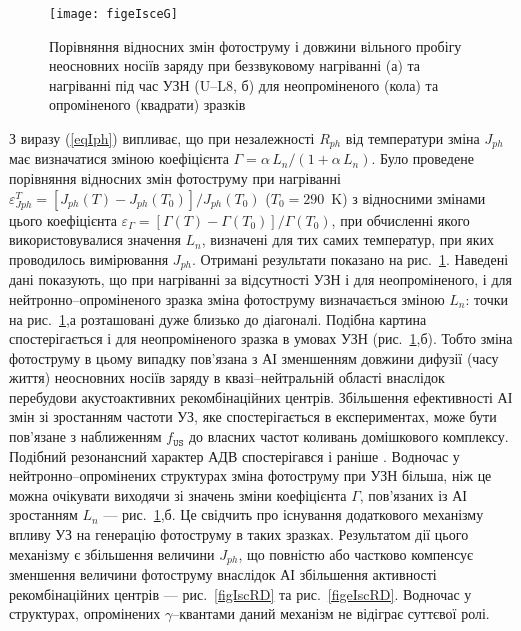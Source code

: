 \begin{figure}
\center
\texttt{[image: figeIsceG]}
\caption{\label{figeIsceG}
Порівняння відносних змін фотоструму і довжини
вільного пробігу неосновних носіїв заряду при беззвуковому
нагріванні (а) та нагріванні під час УЗН (U--L8, б)
для неопроміненого (кола) та опроміненого (квадрати) зразків
}%
\end{figure}

З виразу (\ref{eqIph}) випливає, що при незалежності $R_{ph}$ від температури
зміна $J_{ph}$ має визначатися зміною
коефіцієнта $\Gamma=\alpha\,L_n/(1+\alpha\,L_n)$.
Було проведене порівняння відносних змін
фотоструму при нагріванні $\varepsilon^T_{Jph}=[J_{ph}(T)-J_{ph}(T_0)]/J_{ph}(T_0)$
($T_0=290$~K)
з відносними змінами цього коефіцієнта $\varepsilon_\Gamma=[\Gamma(T)-\Gamma(T_0)]/\Gamma(T_0)$,
при обчисленні якого використовувалися значення  $L_n$, визначені
для тих самих температур, при яких проводилось вимірювання $J_{ph}$.
Отримані результати показано на рис.~\ref{figeIsceG}.
Наведені дані показують, що при нагріванні за відсутності УЗН і для неопроміненого,
і для нейтронно--опроміненого зразка зміна фотоструму визначається зміною
$L_n$:
точки на рис.~\ref{figeIsceG},а розташовані дуже близько до діагоналі.
Подібна картина спостерігається і для неопроміненого зразка в
умовах УЗН (рис.~\ref{figeIsceG},б).
Тобто зміна фотоструму в цьому випадку пов'язана з АІ зменшенням
довжини дифузії (часу життя) неосновних носіїв заряду в квазі--нейтральній
області внаслідок перебудови акустоактивних рекомбінаційних центрів.
Збільшення ефективності АІ змін зі зростанням частоти УЗ, яке
спостерігається в експериментах, може бути пов'язане з наближенням
$f_\mathtt{US}$ до власних частот коливань домішкового комплексу.
Подібний резонансний характер АДВ спостерігався і раніше \cite{Ol_Shav}.
Водночас у нейтронно--опромінених структурах зміна фотоструму при УЗН більша,
ніж це можна очікувати виходячи зі значень зміни коефіцієнта $\Gamma$, пов’язаних із АІ зростанням $L_n$ --- рис.~\ref{figeIsceG},б.
Це свідчить про існування додаткового механізму впливу УЗ на генерацію фотоструму в таких зразках.
Результатом дії цього механізму є збільшення величини $J_{ph}$, що повністю або частково компенсує
зменшення величини фотоструму внаслідок АІ збільшення активності рекомбінаційних центрів --- рис.~\ref{figIscRD} та рис.~\ref{figeIscRD}.
Водночас у структурах, опромінених $\gamma$--квантами даний механізм не відіграє суттєвої ролі.


